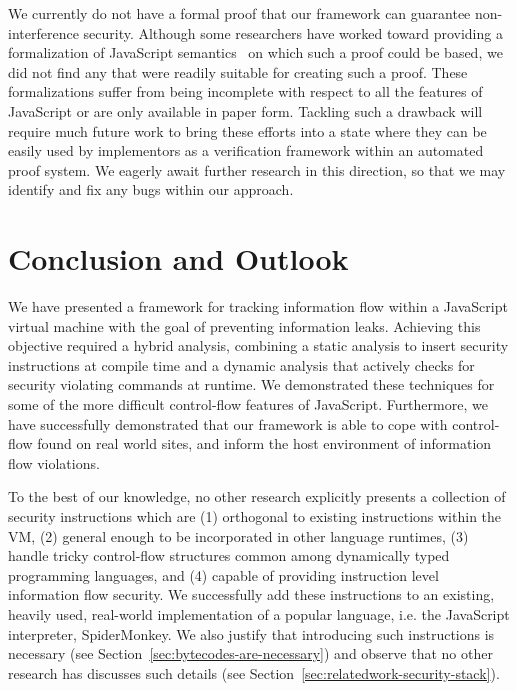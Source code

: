 \documentclass[preprint]{sigplanconf}
\begin{document}
We currently do not have a formal proof that our framework can guarantee non-interference security.
Although some researchers have worked toward providing a formalization of JavaScript semantics~\cite{yu2007javascript, herman2007status, maffeis2008operational, guha2010essence} on which such a proof could be based, we did not find any that were readily suitable for creating such a proof.
These formalizations suffer from being incomplete with respect to all the features of JavaScript or are only available in paper form.
Tackling such a drawback will require much future work to bring these efforts into a state where they can be easily used by implementors as a verification framework within an automated proof system.
We eagerly await further research in this direction, so that we may identify and fix any bugs within our approach.


\section{Conclusion and Outlook}
\label{sec:conclusion}

We have presented a framework for tracking information flow within a JavaScript virtual machine with the goal of preventing information leaks.
Achieving this objective required a hybrid analysis, combining a static analysis to insert security instructions at compile time and a dynamic analysis that actively checks for security violating commands at runtime.
We demonstrated these techniques for some of the more difficult control-flow features of JavaScript.
Furthermore, we have successfully demonstrated that our framework is able to cope with control-flow found on real world sites, and inform the host environment of information flow violations.

To the best of our knowledge, no other research explicitly presents a collection of security instructions which are (1) orthogonal to existing instructions within the VM, (2) general enough to be incorporated in other language runtimes, (3) handle tricky control-flow structures common among dynamically typed programming languages, and (4) capable of providing instruction level information flow security.
We successfully add these instructions to an existing, heavily used, real-world implementation of a popular language, i.e. the JavaScript interpreter, SpiderMonkey.
We also justify that introducing such instructions is necessary (see Section~\ref{sec:bytecodes-are-necessary}) and observe that no other research has discusses such details (see Section~\ref{sec:relatedwork-security-stack}).
\end{document}
